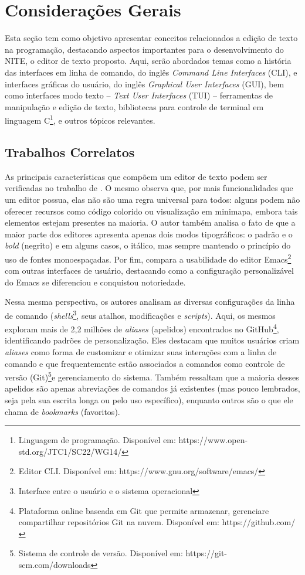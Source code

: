 \chapter{Considerações Gerais}
\label{cap:02}

Esta seção tem como objetivo apresentar conceitos relacionados a edição de texto na programação, destacando aspectos importantes para o desenvolvimento do NITE, o editor de texto proposto. Aqui, serão abordados temas como a história das interfaces em linha de comando, do inglês \textit{Command Line Interfaces} (CLI), e interfaces gráficas do usuário, do inglês \textit{Graphical User Interfaces} (GUI), bem como interfaces modo texto -- \textit{Text User Interfaces} (TUI) -- ferramentas de manipulação e edição de texto, bibliotecas para controle de terminal em linguagem C\footnote{Linguagem de programação. Disponível em: https://www.open-std.org/JTC1/SC22/WG14/}, e outros tópicos relevantes.

\section{Trabalhos Correlatos}

As principais características que compõem um editor de texto podem ser verificadas no trabalho de . O mesmo observa que, por mais funcionalidades que um editor possua, elas não são uma regra universal para todos: alguns podem não oferecer recursos como código colorido ou visualização em minimapa, embora tais elementos estejam presentes na maioria. O autor também analisa o fato de que a maior parte dos editores apresenta apenas dois modos tipográficos: o padrão e o \textit{bold} (negrito) e em alguns casos, o itálico, mas sempre mantendo o princípio do uso de fontes monoespaçadas. Por fim, compara a usabilidade do editor Emacs\footnote{Editor CLI. Disponível em: https://www.gnu.org/software/emacs/} com outras interfaces de usuário, destacando como a configuração personalizável do Emacs se diferenciou e conquistou notoriedade.

Nessa mesma perspectiva, os autores  analisam as diversas configurações da linha de comando (\textit{shells}\footnote{Interface entre o usuário e o sistema operacional}, seus atalhos, modificações e \textit{scripts}). Aqui, os mesmos exploram mais de 2,2 milhões de \textit{aliases} (apelidos) encontrados no GitHub\footnote{Plataforma online baseada em Git que permite armazenar, gerenciare compartilhar repositórios Git na nuvem. Disponível em: https://github.com/}, identificando padrões de personalização. Eles destacam que muitos usuários criam \textit{aliases} como forma de customizar e otimizar suas interações com a linha de comando e que frequentemente estão associados a comandos como controle de versão (Git)\footnote{Sistema de controle de versão. Disponível em: https://git-scm.com/downloads}e gerenciamento do sistema. Também ressaltam que a maioria desses apelidos são apenas abreviações de comandos já existentes (mas pouco lembrados, seja pela sua escrita longa ou pelo uso específico), enquanto outros são o que ele chama de \textit{bookmarks} (favoritos).

